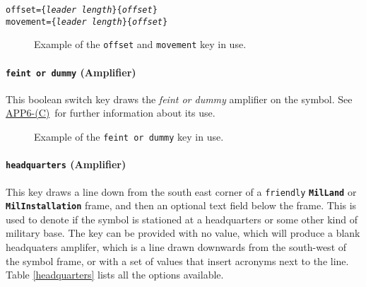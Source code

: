 \documentclass[a4paper, titlepage]{article}
\newcommand\DocLink{\href{https://www.awl.edu.pl/images/en/APP_6_C.pdf}{APP6-(C)}}
\begin{document}
\texttt{offset=\{\textit{leader length}\}\{\textit{offset}\}}\\
\indent\texttt{movement=\{\textit{leader length}\}\{\textit{offset}\}}

\begin{figure}[H]
\centering
{}
\caption{Example of the \texttt{offset} and \texttt{movement}  key in use.}
\end{figure}

\paragraph{\texttt{feint or dummy} (Amplifier)}

This boolean switch key draws the \textit{feint or dummy} amplifier on the symbol. See \DocLink\ for further information about its use.

 \begin{figure}[H]
\centering
{}
\caption{Example of the \texttt{feint or dummy} key in use.}
\end{figure}

\paragraph{\texttt{headquarters} (Amplifier)}

This key draws a line down from the south east corner of a \texttt{friendly} \textbf{\texttt{MilLand}} or \textbf{\texttt{MilInstallation}} frame, and then an optional text field below the frame. This is used to denote if the symbol is stationed at a headquarters or some other kind of military base. The key can be provided with no value, which will produce a blank headquaters amplifer, which is a line drawn downwards from the south-west of the symbol frame, or with a set of values that insert acronyms next to the line. Table \ref{headquarters} lists all the options available.
\end{document}
